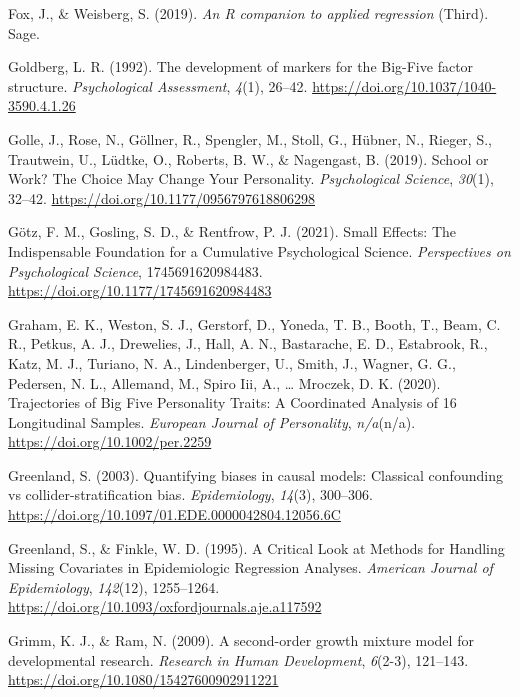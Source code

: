 \documentclass[
  english,
  man, noextraspace]{apa7}
\begin{document}
\leavevmode\hypertarget{ref-car2019}{}%
Fox, J., \& Weisberg, S. (2019). \emph{An R companion to applied regression} (Third). Sage.

\leavevmode\hypertarget{ref-goldbergDevelopmentMarkersBigFive1992}{}%
Goldberg, L. R. (1992). The development of markers for the Big-Five factor structure. \emph{Psychological Assessment}, \emph{4}(1), 26--42. \url{https://doi.org/10.1037/1040-3590.4.1.26}

\leavevmode\hypertarget{ref-golleSchoolWorkChoice2019}{}%
Golle, J., Rose, N., Göllner, R., Spengler, M., Stoll, G., Hübner, N., Rieger, S., Trautwein, U., Lüdtke, O., Roberts, B. W., \& Nagengast, B. (2019). School or Work? The Choice May Change Your Personality. \emph{Psychological Science}, \emph{30}(1), 32--42. \url{https://doi.org/10.1177/0956797618806298}

\leavevmode\hypertarget{ref-gotzSmallEffectsIndispensable2021}{}%
Götz, F. M., Gosling, S. D., \& Rentfrow, P. J. (2021). Small Effects: The Indispensable Foundation for a Cumulative Psychological Science. \emph{Perspectives on Psychological Science}, 1745691620984483. \url{https://doi.org/10.1177/1745691620984483}

\leavevmode\hypertarget{ref-grahamTrajectoriesBigFive2020}{}%
Graham, E. K., Weston, S. J., Gerstorf, D., Yoneda, T. B., Booth, T., Beam, C. R., Petkus, A. J., Drewelies, J., Hall, A. N., Bastarache, E. D., Estabrook, R., Katz, M. J., Turiano, N. A., Lindenberger, U., Smith, J., Wagner, G. G., Pedersen, N. L., Allemand, M., Spiro Iii, A., \ldots{} Mroczek, D. K. (2020). Trajectories of Big Five Personality Traits: A Coordinated Analysis of 16 Longitudinal Samples. \emph{European Journal of Personality}, \emph{n/a}(n/a). \url{https://doi.org/10.1002/per.2259}

\leavevmode\hypertarget{ref-greenlandQuantifyingBiasesCausal2003}{}%
Greenland, S. (2003). Quantifying biases in causal models: Classical confounding vs collider-stratification bias. \emph{Epidemiology}, \emph{14}(3), 300--306. \url{https://doi.org/10.1097/01.EDE.0000042804.12056.6C}

\leavevmode\hypertarget{ref-greenlandCriticalLookMethods1995}{}%
Greenland, S., \& Finkle, W. D. (1995). A Critical Look at Methods for Handling Missing Covariates in Epidemiologic Regression Analyses. \emph{American Journal of Epidemiology}, \emph{142}(12), 1255--1264. \url{https://doi.org/10.1093/oxfordjournals.aje.a117592}

\leavevmode\hypertarget{ref-grimmSecondorderGrowthMixture2009}{}%
Grimm, K. J., \& Ram, N. (2009). A second-order growth mixture model for developmental research. \emph{Research in Human Development}, \emph{6}(2-3), 121--143. \url{https://doi.org/10.1080/15427600902911221}
\end{document}
